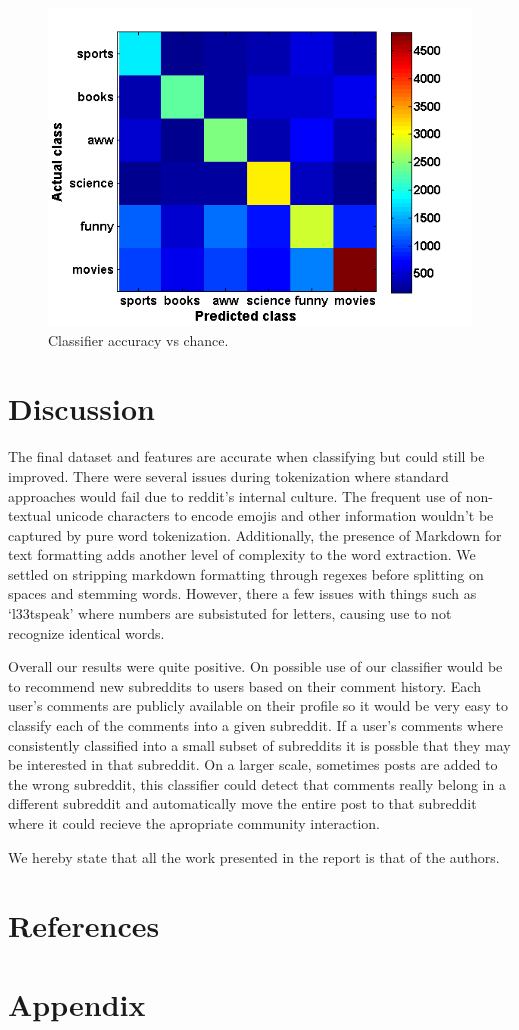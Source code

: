 \documentclass[10pt,twocolumn]{article}
\begin{document}
	
\begin{figure}
    \centering
  	\includegraphics[scale=0.4]{./confusion_mat.png}
  	\caption{Classifier accuracy vs chance.}
  	\label{fig:RSUencountered}
\end{figure}	
		
\section{Discussion}
The final dataset and features are accurate when classifying but could still be improved. There were several issues during tokenization where standard approaches would fail due to reddit's internal culture. The frequent use of non-textual unicode characters to encode emojis and other information wouldn't be captured by pure word tokenization. Additionally, the presence of Markdown for text formatting adds another level of complexity to the word extraction. We settled on stripping markdown formatting through regexes before splitting on spaces and stemming words. However, there a few issues with things such as `l33tspeak' where numbers are subsistuted for letters, causing use to not recognize identical words. 

Overall our results were quite positive. On possible use of our classifier would be to recommend new subreddits to users based on their comment history. Each user's comments are publicly available on their profile so it would be very easy to classify each of the comments into a given subreddit. If a user's comments where consistently classified into a small subset of subreddits it is possble that they may be interested in that subreddit. On a larger scale, sometimes posts are added to the wrong subreddit, this classifier could detect that comments really belong in a different subreddit and automatically move the entire post to that subreddit where it could recieve the apropriate community interaction.

We hereby state that all the work presented in the report is that of the authors.

\section{References}
\printbibliography
\section{Appendix}
\end{document}
